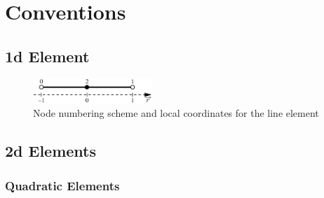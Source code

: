 \chapter{Conventions}

\section{1d Element}
\begin{figure}[h!]
\begin{center}
\includegraphics[width=0.4\textwidth]{figures/line}
\caption{Node numbering scheme and local coordinates for the line element}
\label{fig:conventions:1d}
\end{center}
\end{figure}

\newpage
\section{2d Elements}
\subsection{Quadratic Elements}


